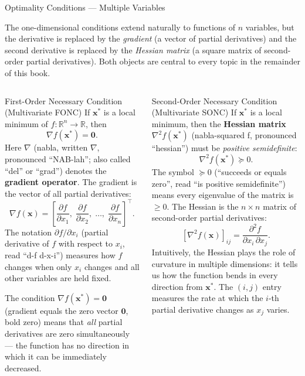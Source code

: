 \documentclass[aspectratio=169,10pt]{beamer}
\newcommand{\vx}{\mathbf{x}}
\newcommand{\R}{\mathbb{R}}
\newcommand{\grad}{\nabla}
\newcommand{\hess}{\nabla^2}
\begin{document}
\begin{frame}[allowframebreaks]{Optimality Conditions --- Multiple Variables}

The one-dimensional conditions extend naturally to functions of $n$ variables,
but the derivative is replaced by the \emph{gradient} (a vector of partial
derivatives) and the second derivative is replaced by the \emph{Hessian matrix}
(a square matrix of second-order partial derivatives).  Both objects are central
to every topic in the remainder of this book.

  \begin{columns}[T]

      \begin{alertblock}{First-Order Necessary Condition (Multivariate FONC)}
        If $\vx^*$ is a local minimum of $f : \R^n \to \R$, then
        \[
          \grad f(\vx^*) = \mathbf{0}.
        \]
        Here $\grad$ (nabla, written $\nabla$, pronounced ``NAB-lah''; also
        called ``del'' or ``grad'') denotes the \textbf{gradient operator}.
        The gradient is the vector of all partial derivatives:
        \[
          \grad f(\vx) = \left[\frac{\partial f}{\partial x_1},\;
          \frac{\partial f}{\partial x_2},\; \ldots,\;
          \frac{\partial f}{\partial x_n}\right]^\top.
        \]
        The notation $\partial f / \partial x_i$ (partial derivative of $f$
        with respect to $x_i$, read ``d-f d-x-i'') measures how $f$ changes
        when only $x_i$ changes and all other variables are held fixed.

        \medskip
        The condition $\grad f(\vx^*) = \mathbf{0}$ (gradient equals the
        zero vector $\mathbf{0}$, bold zero) means that \emph{all} partial
        derivatives are zero simultaneously --- the function has no direction
        in which it can be immediately decreased.
      \end{alertblock}


      \begin{alertblock}{Second-Order Necessary Condition (Multivariate SONC)}
        If $\vx^*$ is a local minimum, then the \textbf{Hessian matrix}
        $\hess f(\vx^*)$ (nabla-squared f, pronounced ``hessian'') must be
        \emph{positive semidefinite}:
        \[
          \hess f(\vx^*) \succeq 0.
        \]
        The symbol $\succeq 0$ (``succeeds or equals zero'', read ``is positive
        semidefinite'') means every eigenvalue of the matrix is $\geq 0$.
        The Hessian is the $n \times n$ matrix of second-order partial
        derivatives:
        \[
          [\hess f(\vx)]_{ij} = \frac{\partial^2 f}{\partial x_i \,\partial x_j}.
        \]
        Intuitively, the Hessian plays the role of curvature in multiple
        dimensions: it tells us how the function bends in every direction from
        $\vx^*$.  The $(i,j)$ entry measures the rate at which the
        $i$-th partial derivative changes as $x_j$ varies.
      \end{alertblock}


\end{columns}
\end{frame}
\end{document}
